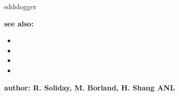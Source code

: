 \begin{sddsprog}{sddslogger}
\item {\bf see also:}
    \begin{itemize}
    \item {}
    \item {}
    \item {}
    \item {}
    \end{itemize}
\item {\bf author: R. Soliday, M. Borland, H. Shang ANL} 
\end{sddsprog}
